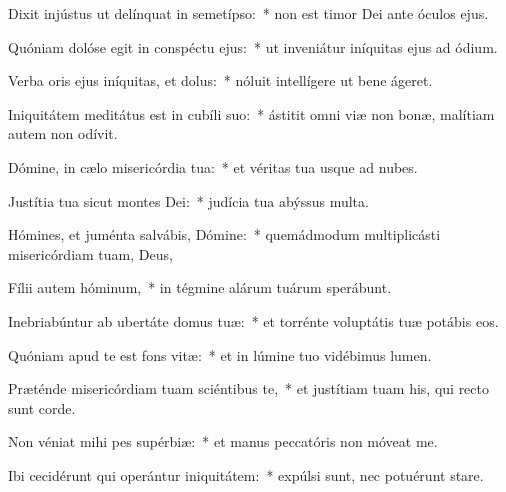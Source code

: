 \item Dixit injústus ut delínquat in semetípso:~* non est timor Dei ante óculos ejus.

\item Quóniam dolóse egit in conspéctu ejus:~* ut inveniátur iníquitas ejus ad ódium.

\item Verba oris ejus iníquitas, et dolus:~* nóluit intellígere ut bene ágeret.

\item Iniquitátem meditátus est in cubíli suo:~* ástitit omni viæ non bonæ, malítiam autem non odívit.

\item Dómine, in cælo misericórdia tua:~* et véritas tua usque ad nubes.

\item Justítia tua sicut montes Dei:~* judícia tua abýssus multa.

\item Hómines, et juménta salvábis, Dómine:~* quemádmodum multiplicásti misericórdiam tuam, Deus,

\item Fílii autem hóminum,~* in tégmine alárum tuárum sperábunt.

\item Inebriabúntur ab ubertáte domus tuæ:~* et torrénte voluptátis tuæ potábis eos.

\item Quóniam apud te est fons vitæ:~* et in lúmine tuo vidébimus lumen.

\item Præténde misericórdiam tuam sciéntibus te,~* et justítiam tuam his, qui recto sunt corde.

\item Non véniat mihi pes supérbiæ:~* et manus peccatóris non móveat me.

\item Ibi cecidérunt qui operántur iniquitátem:~* expúlsi sunt, nec potuérunt stare.
